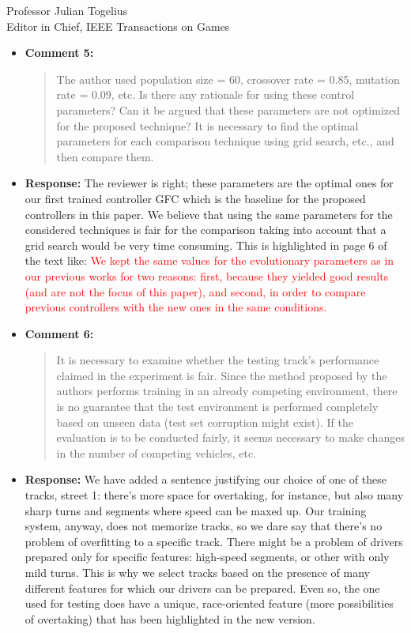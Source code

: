 \documentclass[10pt]{letter} %
\begin{document}
\begin{letter}{Professor Julian Togelius \\ Editor in Chief, IEEE Transactions on Games}
\begin{enumerate}
\begin{itemize}
		\item {\bf Comment 5:}
		\begin{quote}
The author used population size = 60, crossover rate = 0.85, mutation rate = 0.09, etc. Is there any rationale for using these control parameters? Can it be argued that these parameters are not optimized for the proposed technique? It is necessary to find the optimal parameters for each comparison technique using grid search, etc., and then compare them.
			\end{quote}	
		\item {\bf Response:} 
		The reviewer is right; these parameters are the optimal ones for our first trained controller GFC which is the baseline for the proposed controllers in this paper. We believe that using the same parameters for the considered techniques is fair for the comparison taking into account that a grid search would be very time consuming. 
		This is highlighted in page 6 of the text like:
		\textcolor{red}{
		We kept the same values for the evolutionary parameters as in our previous works for two reasons: first, because they yielded good results (and are not the focus of
		this paper), and second, in order to compare previous controllers with
		the new ones in the same conditions.}
		
		\item {\bf Comment 6:}
		\begin{quote}
It is necessary to examine whether the testing track's performance claimed in the experiment is fair. Since the method proposed by the authors performs training in an already competing environment, there is no guarantee that the test environment is performed completely based on unseen data (test set corruption might exist). If the evaluation is to be conducted fairly, it seems necessary to make changes in the number of competing vehicles, etc.
			\end{quote}
		\item {\bf Response:} We have added a sentence
                  justifying our choice of one of these tracks, {\sf
                    street 1}:
                  there's more space for overtaking, for instance, but
                  also many sharp turns and segments where speed can
                  be maxed up. Our training system, anyway, does not
                  memorize tracks, so we dare say that there's no
                  problem of overfitting to a specific track. There
                  might be a problem of drivers prepared only for
                  specific features: high-speed segments, or other
                  with only mild turns. This is why we select tracks
                  based on the presence of many different features for
                  which our drivers can be prepared. Even so, the one
                  used for testing does have a unique, race-oriented
                  feature (more possibilities of overtaking) that has
                  been highlighted in the new version.


\end{itemize}
\end{enumerate}
\end{letter}
\end{document}
